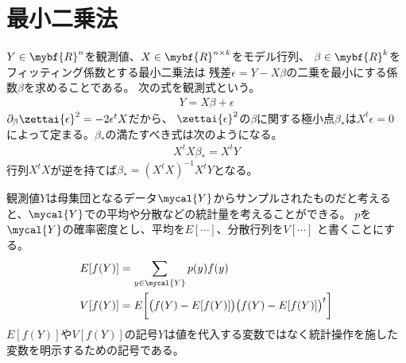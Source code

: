 
\section{最小二乗法}\label{s1:最小二乗法} %
	$Y\in\mybf{R}^n$を観測値、$X\in\mybf{R}^{n\times k}$をモデル行列、
	$\beta\in\mybf{R}^k$をフィッティング係数とする最小二乗法は
	残差$\epsilon=Y-X\beta$の二乗を最小にする係数$\beta$を求めることである。
	次の式を観測式という。
	\begin{equation*}\begin{split} %
		Y = X\beta + \epsilon
	\end{split}\end{equation*} %
	$\partial_\beta\zettai{\epsilon}^2=-2\epsilon^tX$だから、
	$\zettai{\epsilon}^2$の$\beta$に関する極小点$\beta_*$は$X^t\epsilon=0$
	によって定まる。$\beta_*$の満たすべき式は次のようになる。
	\begin{equation*}\begin{split} %
		X^tX\beta_* = X^tY
	\end{split}\end{equation*} %
	行列$X^tX$が逆を持てば$\beta_*=(X^tX)^{-1}X^tY$となる。

	観測値$Y$は母集団となるデータ$\mycal{Y}$からサンプルされたものだと考える
	と、$\mycal{Y}$での平均や分散などの統計量を考えることができる。
	$p$を$\mycal{Y}$の確率密度とし、平均を$E[\cdots]$、分散行列を$V[\cdots]$
	と書くことにする。
	\begin{equation*}\begin{split} %
		E[f(Y)] &= \sum_{y\in\mycal{Y}}p(y)f(y) \\
		V[f(Y)] &= E\biggl[
			\bigl(f(Y)-E[f(Y)]\bigr)\bigl(f(Y)-E[f(Y)]\bigr)^t\biggr] \\
	\end{split}\end{equation*} %
	$E[f(Y)]$や$V[f(Y)]$の記号$Y$は値を代入する変数ではなく統計操作を施した
	変数を明示するための記号である。

